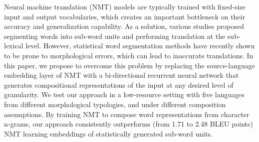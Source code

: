 Neural machine translation (NMT) models are typically trained with fixed-size input and output vocabularies, which creates an important bottleneck on their accuracy and generalization capability. As a solution, various studies proposed segmenting words into sub-word units and performing translation at the sub-lexical level. However, statistical word segmentation methods have recently shown to be prone to morphological errors, which can lead to inaccurate translations. In this paper, we propose to overcome this problem by replacing the source-language embedding layer of NMT with a bi-directional recurrent neural network that generates compositional representations of the input at any desired level of granularity. We test our approach in a low-resource setting with five languages from different morphological typologies, and under different composition assumptions. By training NMT to compose word representations from character n-grams, our approach consistently outperforms (from 1.71 to 2.48 BLEU points) NMT learning embeddings of statistically generated sub-word units.
